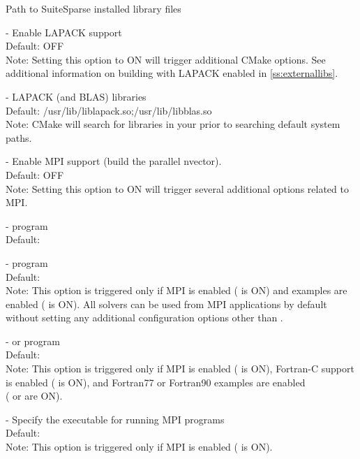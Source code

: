 \begin{description}
  Path to SuiteSparse installed library files
\item[\id{LAPACK\_ENABLE}] -  
  Enable LAPACK support
  \\
  Default: OFF
  \\
  Note: Setting this option to ON will trigger additional CMake
  options. See additional information on building with LAPACK enabled
  in \ref{ss:externallibs}.
\item[\id{LAPACK\_LIBRARIES}] - 
  LAPACK (and BLAS) libraries
  \\
  Default: /usr/lib/liblapack.so;/usr/lib/libblas.so
  \\
  Note: CMake will search for libraries in your  prior
  to searching default system paths.
\item[\id{MPI\_ENABLE}] -
  Enable MPI support (build the parallel nvector).
  \\
  Default: OFF 
  \\
  Note: Setting this option to ON will trigger several additional options
  related to MPI.
\item[\id{MPI\_C\_COMPILER}] -
   program
  \\
  Default: 
\item[\id{MPI\_CXX\_COMPILER}] -
   program
  \\
  Default: 
  \\
  Note: This option is triggered only if MPI is enabled
  ( is ON) and {\CPP} examples are enabled
  ( is ON). All {\sundials}
  solvers can be used from {\CPP} MPI applications by default
  without setting any additional configuration options other than
  .
\item[\id{MPI\_Fortran\_COMPILER}] -
   or  program
  \\
  Default: 
  \\
  Note: This option is triggered only if MPI is enabled
  ( is ON), Fortran-C support is enabled
  ( is ON), and Fortran77 or Fortran90
  examples are enabled \\ \noindent
  ( or
   are ON).
\item[\id{MPIEXEC\_EXECUTABLE}] -
  Specify the executable for running MPI programs
  \\
  Default: 
  \\
  Note: This option is triggered only if MPI is enabled
  ( is ON).

\end{description}
